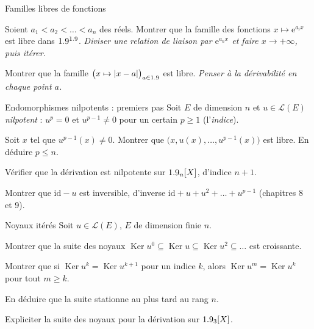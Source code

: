 \begin{exercice}[3]{Familles libres de fonctions}
\begin{questions}
  \item Soient $a_1<a_2<\dots<a_n$ des réels. Montrer que la famille des
    fonctions $x\mapsto\mathrm{e}^{a_ix}$ est libre dans $1.9^{1.9}$.
    \emph{Diviser une relation de liaison par $\mathrm{e}^{a_nx}$ et faire
    $x\to+\infty$, puis itérer.}
  \item Montrer que la famille $\bigl(x\mapsto|x-a|\bigr)_{a\in1.9}$ est
    libre. \emph{Penser à la dérivabilité en chaque point $a$.}
\end{questions}
\end{exercice}

\begin{exercice}[3]{Endomorphismes nilpotents : premiers pas}
Soit $E$ de dimension $n$ et $u\in\mathcal{L}(E)$ \emph{nilpotent} :
$u^{p}=0$ et $u^{p-1}\neq0$ pour un certain $p\geqslant1$ (l'\emph{indice}).
\begin{questions}
  \item Soit $x$ tel que $u^{p-1}(x)\neq0$. Montrer que
    $\bigl(x,u(x),\dots,u^{p-1}(x)\bigr)$ est libre. En déduire
    $p\leqslant n$.
  \item Vérifier que la dérivation est nilpotente sur $1.9_n[X]$, d'indice
    $n+1$.
  \item Montrer que $\mathrm{id}-u$ est inversible, d'inverse
    $\mathrm{id}+u+u^{2}+\dots+u^{p-1}$ (chapitres 8 et 9).
\end{questions}
\end{exercice}

\begin{exercice}[3]{Noyaux itérés}
Soit $u\in\mathcal{L}(E)$, $E$ de dimension finie $n$.
\begin{questions}
  \item Montrer que la suite des noyaux
    $\operatorname{Ker}u^{0}\subseteq\operatorname{Ker}u\subseteq
    \operatorname{Ker}u^{2}\subseteq\dots$ est croissante.
  \item Montrer que si $\operatorname{Ker}u^{k}=\operatorname{Ker}u^{k+1}$
    pour un indice $k$, alors $\operatorname{Ker}u^{m}=\operatorname{Ker}u^{k}$
    pour tout $m\geqslant k$.
  \item En déduire que la suite stationne au plus tard au rang $n$.
  \item Expliciter la suite des noyaux pour la dérivation sur $1.9_3[X]$.
\end{questions}
\end{exercice}

